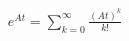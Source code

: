 \documentclass[preview]{standalone}
\begin{document}
\begin{align*}
e^{At} = \sum_{k=0}^{\infty} \frac{(At)^k}{k!}
\end{align*}
\end{document}
